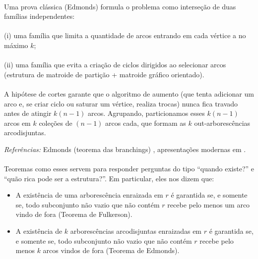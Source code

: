 \documentclass[12pt,a4paper]{article}
\begin{document}
\begin{center}
{{\paragraph{}
Uma prova clássica (Edmonds) formula o problema como interseção de duas famílias independentes: 

\paragraph{}
(i) uma família que limita a quantidade de arcos entrando em cada vértice a no máximo $k$; 

\paragraph{}
(ii) uma família que evita a criação de ciclos dirigidos ao selecionar arcos (estrutura de matroide de partição + matroide gráfico orientado). 

\paragraph{}
A hipótese de cortes garante que o algoritmo de aumento (que tenta adicionar um arco e, se criar ciclo ou saturar um vértice, realiza trocas) nunca fica travado antes de atingir $k(n-1)$ arcos. Agrupando, particionamos esses $k(n-1)$ arcos em $k$ coleções de $(n-1)$ arcos cada, que formam as $k$ out-arborescências arcodisjuntas.

\medskip
\emph{Referências:} Edmonds (teorema das branchings) \cite{edmonds1967optimum}, apresentações modernas em \cite{schrijver2003comb}.
\label{thm:edmonds-disjoint-arborescencias}    
}}
\endgroup
\end{center}

\paragraph{}
Teoremas como esses servem para responder perguntas do tipo “quando existe?” e “quão rica pode ser a estrutura?”. Em particular, eles nos dizem que:
\begin{itemize}\setlength{\itemsep}{2pt}
    \item A existência de uma arborescência enraizada em \(r\) é garantida se, e somente se, todo subconjunto não vazio que não contém \(r\) recebe pelo menos um arco vindo de fora (Teorema de Fulkerson).
    \item A existência de \(k\) arborescências arcodisjuntas enraizadas em \(r\) é garantida se, e somente se, todo subconjunto não vazio que não contém \(r\) recebe pelo menos \(k\) arcos vindos de fora (Teorema de Edmonds).
\end{itemize}
\end{document}
